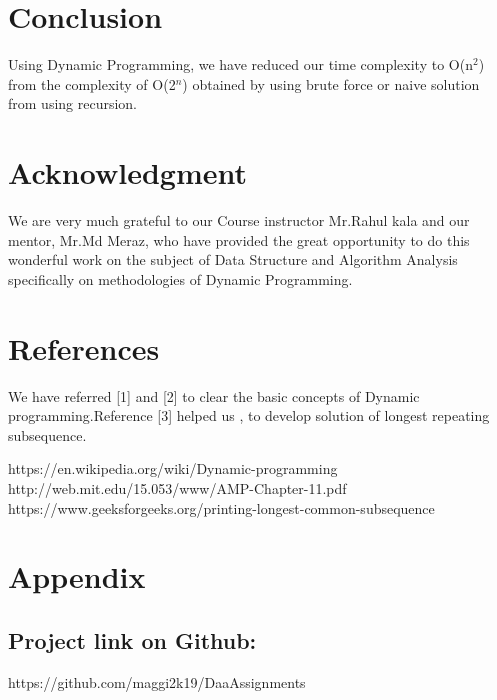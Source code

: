\documentclass[conference]{IEEEtran}
\begin{document}

\section{Conclusion}
Using Dynamic Programming, we have reduced our time complexity to O(n$^{2}$) from the complexity of O(2$^{n}$) obtained by using brute force or naive solution from using recursion.

\section{Acknowledgment}
We are very much grateful to our Course instructor Mr.Rahul kala and our mentor, Mr.Md Meraz, who have provided the great opportunity to do this wonderful work on the subject of Data Structure and Algorithm Analysis specifically on methodologies of Dynamic Programming.

\section{References}

We have referred [1] and [2] to clear the basic concepts of Dynamic programming.Reference [3] helped us , to develop solution of longest repeating subsequence.
\begin{thebibliography}{00}
https://en.wikipedia.org/wiki/Dynamic-programming
http://web.mit.edu/15.053/www/AMP-Chapter-11.pdf
https://www.geeksforgeeks.org/printing-longest-common-subsequence
\end{thebibliography}

\section{Appendix}

\subsection{Project link on Github:}
https://github.com/maggi2k19/DaaAssignments
\end{document}

